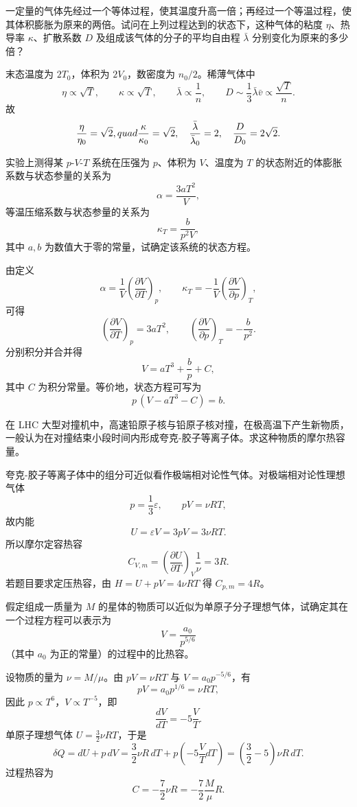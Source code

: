 \begin{question}
一定量的气体先经过一个等体过程，使其温度升高一倍；再经过一个等温过程，使其体积膨胀为原来的两倍。试问在上列过程达到的状态下，这种气体的粘度 $\eta$、热导率 $\kappa$、扩散系数 $D$ 及组成该气体的分子的平均自由程 $\bar\lambda$ 分别变化为原来的多少倍？
\begin{solution}
末态温度为 $2T_0$，体积为 $2V_0$，数密度为 $n_0/2$。稀薄气体中
\[
\eta\propto \sqrt T,
\qquad \kappa\propto \sqrt T,
\qquad \bar\lambda\propto \frac1n,
\qquad D\sim \frac13\bar\lambda\bar v\propto \frac{\sqrt T}{n}.
\]
故
\[
\frac{\eta}{\eta_0}=\sqrt2,\\quad
\frac{\kappa}{\kappa_0}=\sqrt2,
\quad
\frac{\bar\lambda}{\bar\lambda_0}=2,
\quad
\frac{D}{D_0}=2\sqrt2.
\]
\end{solution}
\end{question}

\begin{question}
实验上测得某 $p$-$V$-$T$ 系统在压强为 $p$、体积为 $V$、温度为 $T$ 的状态附近的体膨胀系数与状态参量的关系为
\[
\alpha=\frac{3aT^2}{V},
\]
等温压缩系数与状态参量的关系为
\[
\kappa_T=\frac{b}{p^2V},
\]
其中 $a,b$ 为数值大于零的常量，试确定该系统的状态方程。
\begin{solution}
由定义
\[
\alpha=\frac1V\left(\frac{\partial V}{\partial T}\right)_p,
\qquad
\kappa_T=-\frac1V\left(\frac{\partial V}{\partial p}\right)_T,
\]
可得
\[
\left(\frac{\partial V}{\partial T}\right)_p=3aT^2,
\qquad
\left(\frac{\partial V}{\partial p}\right)_T=-\frac{b}{p^2}.
\]
分别积分并合并得
\[
V=aT^3+\frac{b}{p}+C,
\]
其中 $C$ 为积分常量。等价地，状态方程可写为
\[
p\,(V-aT^3-C)=b.
\]
\end{solution}
\end{question}

\begin{question}
在 LHC 大型对撞机中，高速铅原子核与铅原子核对撞，在极高温下产生新物质，一般认为在对撞结束小段时间内形成夸克-胶子等离子体。求这种物质的摩尔热容量。
\begin{solution}
夸克-胶子等离子体中的组分可近似看作极端相对论性气体。对极端相对论性理想气体
\[
p=\frac13\varepsilon,
\qquad pV=\nu RT,
\]
故内能
\[
U=\varepsilon V=3pV=3\nu RT.
\]
所以摩尔定容热容
\[
C_{V,m}=\left(\frac{\partial U}{\partial T}\right)_V\frac1\nu=3R.
\]
若题目要求定压热容，由 $H=U+pV=4\nu RT$ 得 $C_{p,m}=4R$。
\end{solution}
\end{question}

\begin{question}
假定组成一质量为 $M$ 的星体的物质可以近似为单原子分子理想气体，试确定其在一个过程方程可以表示为
\[
V=\frac{a_0}{p^{5/6}}
\]
（其中 $a_0$ 为正的常量）的过程中的比热容。
\begin{solution}
设物质的量为 $\nu=M/\mu$。由 $pV=\nu RT$ 与 $V=a_0p^{-5/6}$，有
\[
pV=a_0p^{1/6}=\nu RT,
\]
因此 $p\propto T^6$，$V\propto T^{-5}$，即
\[
\frac{dV}{dT}=-5\frac{V}{T}.
\]
单原子理想气体 $U=\frac32\nu RT$，于是
\[
\delta Q=dU+p\,dV=\frac32\nu R\,dT+p\left(-5\frac{V}{T}dT\right)
=\left(\frac32-5\right)\nu R\,dT.
\]
过程热容为
\[
C=-\frac72\nu R=-\frac72\frac{M}{\mu}R.
\]
\end{solution}
\end{question}

